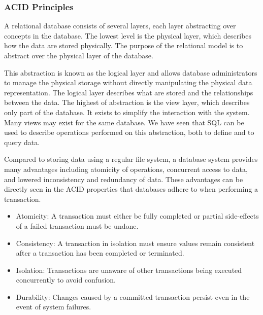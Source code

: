 \subsubsection*{ACID Principles}\label{sec:ACID}

A relational database consists of several layers, each layer abstracting over concepts in the database.
The lowest level is the physical layer, which describes how the data are stored physically.
The purpose of the relational model is to abstract over the physical layer of the database\cite{DBSBook}.

This abstraction is known as the logical layer and allows database administrators to manage the physical storage without directly manipulating the physical data representation.
The logical layer describes what are stored and the relationships between the data\cite{DBSBook}.
The highest of abstraction is the view layer, which describes only part of the database\cite{DBSBook}.
It exists to simplify the interaction with the system. Many views may exist for the same database.
\cite{DBSBook}
We have seen that SQL can be used to describe operations performed on this abstraction, both to define and to query data.

Compared to storing data using a regular file system, a database system provides many advantages including atomicity of operations, concurrent access to data, and lowered inconsistency and redundancy of data\cite{DBSBook}.
These advantages can be directly seen in the ACID properties that databases adhere to when performing a transaction\cite{DBSBook}.
\begin{itemize} \label{ACID}
    \item Atomicity: A transaction must either be fully completed or partial side-effects of a failed transaction must be undone.
    \item Consistency: A transaction in isolation must ensure values remain consistent after a transaction has been completed or terminated.
    \item Isolation: Transactions are unaware of other transactions being executed concurrently to avoid confusion.
    \item Durability: Changes caused by a committed transaction persist even in the event of system failures.
\end{itemize}
